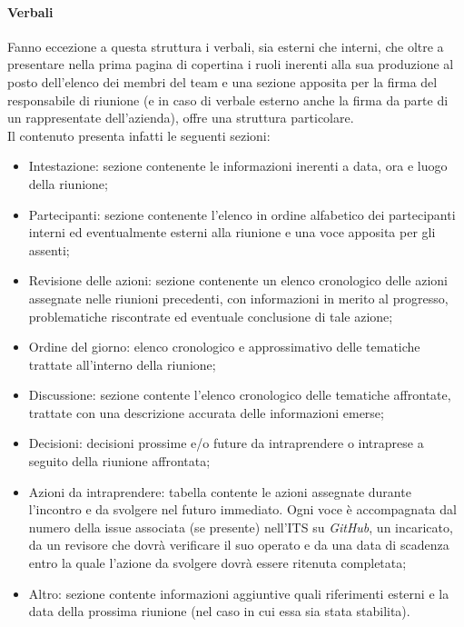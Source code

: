 \documentclass[10pt, a4paper]{article}
\begin{document}
    \paragraph{Verbali}Fanno eccezione a questa struttura i verbali, sia esterni che interni, che oltre a presentare nella prima pagina di copertina i ruoli inerenti alla sua produzione al posto dell'elenco dei membri del team e una sezione apposita per la firma del responsabile di riunione (e in caso di verbale esterno anche la firma da parte di un rappresentate dell'azienda), offre una struttura particolare.\\
    Il contenuto presenta infatti le seguenti sezioni:
    \begin{itemize}
        \item Intestazione: sezione contenente le informazioni inerenti a data, ora e luogo della riunione;
        \item Partecipanti: sezione contenente l'elenco in ordine alfabetico dei partecipanti interni ed eventualmente esterni alla riunione e una voce apposita per gli assenti;
        \item Revisione delle azioni: sezione contenente un elenco cronologico delle azioni assegnate nelle riunioni precedenti, con informazioni in merito al progresso, problematiche riscontrate ed eventuale conclusione di tale azione;
        \item Ordine del giorno: elenco cronologico e approssimativo delle tematiche trattate all'interno della riunione;
        \item Discussione: sezione contente l'elenco cronologico delle tematiche affrontate, trattate con una descrizione accurata delle informazioni emerse;
        \item Decisioni: decisioni prossime e/o future da intraprendere o intraprese a seguito della riunione affrontata;
        \item Azioni da intraprendere: tabella contente le azioni assegnate durante l'incontro e da svolgere nel futuro immediato. Ogni voce è accompagnata dal numero della issue associata (se presente) nell'ITS su \textit{GitHub}, un incaricato, da un revisore che dovrà verificare il suo operato e da una data di scadenza entro la quale l'azione da svolgere dovrà essere ritenuta completata;
        \item Altro: sezione contente informazioni aggiuntive quali riferimenti esterni e la data della prossima riunione (nel caso in cui essa sia stata stabilita).
    \end{itemize}    
\end{document}
